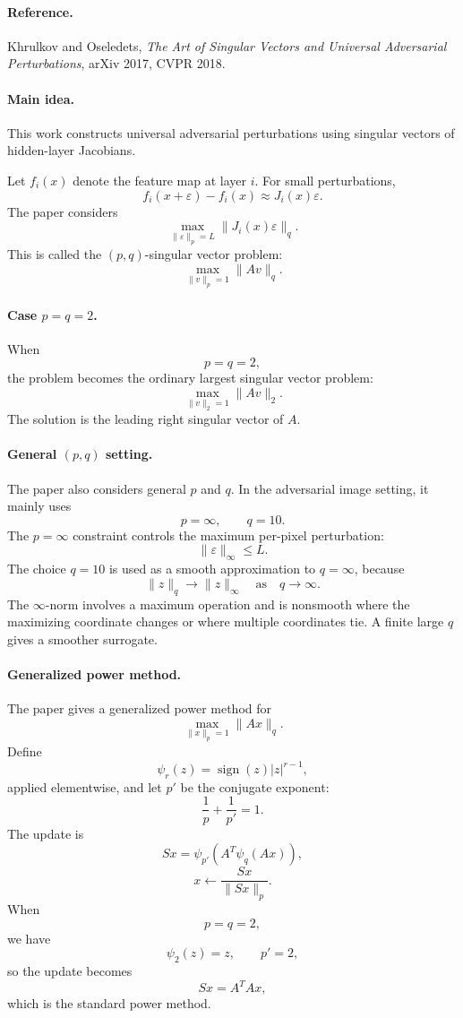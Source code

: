 \documentclass{article}
\begin{document}
\paragraph{Reference.}
Khrulkov and Oseledets, \emph{The Art of Singular Vectors and Universal Adversarial Perturbations}, arXiv 2017, CVPR 2018.

\paragraph{Main idea.}
This work constructs universal adversarial perturbations using singular vectors of hidden-layer Jacobians.

Let \(f_i(x)\) denote the feature map at layer \(i\). For small perturbations,
\[
f_i(x+\varepsilon)-f_i(x)
\approx
J_i(x)\varepsilon.
\]
The paper considers
\[
\max_{\|\varepsilon\|_p=L}
\|J_i(x)\varepsilon\|_q.
\]
This is called the \((p,q)\)-singular vector problem:
\[
\max_{\|v\|_p=1}\|Av\|_q.
\]

\paragraph{Case \(p=q=2\).}
When
\[
p=q=2,
\]
the problem becomes the ordinary largest singular vector problem:
\[
\max_{\|v\|_2=1}\|Av\|_2.
\]
The solution is the leading right singular vector of \(A\).

\paragraph{General \((p,q)\) setting.}
The paper also considers general \(p\) and \(q\). In the adversarial image setting, it mainly uses
\[
p=\infty,
\qquad
q=10.
\]
The \(p=\infty\) constraint controls the maximum per-pixel perturbation:
\[
\|\varepsilon\|_\infty\leq L.
\]
The choice \(q=10\) is used as a smooth approximation to \(q=\infty\), because
\[
\|z\|_q\to \|z\|_\infty
\quad
\text{as}
\quad
q\to\infty.
\]
The \(\infty\)-norm involves a maximum operation and is nonsmooth where the maximizing coordinate changes or where multiple coordinates tie. A finite large \(q\) gives a smoother surrogate.

\paragraph{Generalized power method.}
The paper gives a generalized power method for
\[
\max_{\|x\|_p=1}\|Ax\|_q.
\]
Define
\[
\psi_r(z)=\operatorname{sign}(z)|z|^{r-1},
\]
applied elementwise, and let \(p'\) be the conjugate exponent:
\[
\frac{1}{p}+\frac{1}{p'}=1.
\]
The update is
\[
Sx
=
\psi_{p'}\left(A^T\psi_q(Ax)\right),
\]
\[
x\leftarrow \frac{Sx}{\|Sx\|_p}.
\]
When
\[
p=q=2,
\]
we have
\[
\psi_2(z)=z,
\qquad p'=2,
\]
so the update becomes
\[
Sx=A^TAx,
\]
which is the standard power method.
\end{document}
